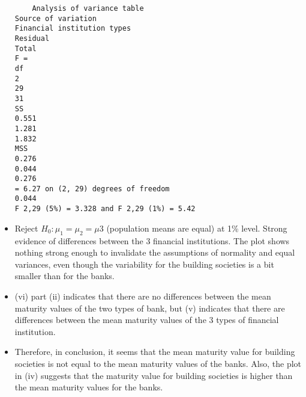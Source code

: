 \documentclass[a4paper,12pt]{article}
\begin{document}
\begin{itemize}
\begin{verbatim}
    Analysis of variance table
Source of variation
Financial institution types
Residual
Total
F =
df
2
29
31
SS
0.551
1.281
1.832
MSS
0.276
0.044
0.276
= 6.27 on (2, 29) degrees of freedom
0.044
F 2,29 (5%) = 3.328 and F 2,29 (1%) = 5.42
\end{verbatim}

\item Reject $H_0 : \mu_{1} = \mu_{2} = \mu 3$ (population means are equal) at 1\% level.
Strong evidence of differences between the 3 financial institutions.
The plot shows nothing strong enough to invalidate the assumptions of
normality and equal variances, even though the variability for the building
societies is a bit smaller than for the banks.
\item (vi)
part (ii) indicates that there are no differences between the mean maturity
values of the two types of bank, but (v) indicates that there are differences
between the mean maturity values of the 3 types of financial institution.
\item Therefore, in conclusion, it seems that the mean maturity value for building
societies is not equal to the mean maturity values of the banks. Also, the plot
in (iv) suggests that the maturity value for building societies is higher than the
mean maturity values for the banks.
\end{itemize}
\end{document}
